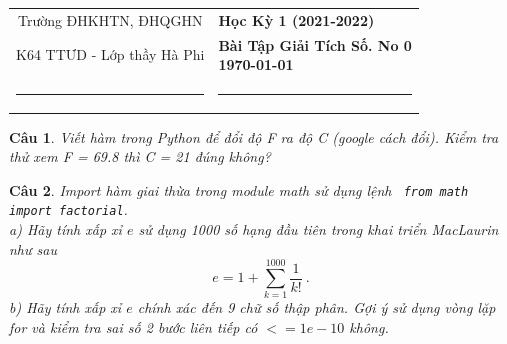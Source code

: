 \documentclass[answers]{exam}
\newtheorem{bt}{Câu}
\begin{document}
\begin{tabular*}
{\linewidth}{c>{\centering\hspace{0pt}} p{}}
Trường ĐHKHTN, ĐHQGHN & {\bf Học Kỳ 1 (2021-2022)}
\tabularnewline
{K64 TTƯD - Lớp thầy Hà Phi} & {\bf Bài Tập Giải Tích Số. No 0 \\ \today}
\tabularnewline
\rule{1in}{1pt}  \small  & \rule{2in}{1pt} %
\tabularnewline

\end{tabular*}
%
\printanswers

\begin{bt}\label{bt1}
Viết hàm trong Python để đổi độ F ra độ C (google cách đổi). Kiểm tra thử xem F = 69.8 thì C = 21 đúng không?
%
%
%
\end{bt}

\begin{bt} 
	Import hàm giai thừa trong module math sử dụng lệnh \verb| from math import factorial|. \\
	a) Hãy tính xấp xỉ $e$ sử dụng 1000 số hạng đầu tiên trong khai triển MacLaurin như sau
	\[
	e = 1 + \sum_{k=1}^{1000} \dfrac{1}{k!} \ .
	\]
	b) Hãy tính xấp xỉ $e$ chính xác đến 9 chữ số thập phân. Gợi ý sử dụng vòng lặp for và kiểm tra sai số 2 bước liên tiếp có $<= 1e-10$ không.
\end{bt}
\end{document}

